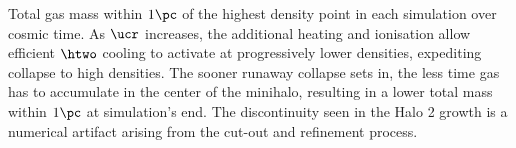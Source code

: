 \label{fig:collapse}
Total gas mass within $1\pc$ of the highest density point in each simulation over cosmic time.
As $\ucr$ increases, the additional heating and ionisation allow efficient $\htwo$ cooling to activate at progressively lower densities, expediting collapse to high densities.  
The sooner runaway collapse sets in, the less time gas has to accumulate in the center of the minihalo, resulting in a lower total mass within $1\pc$ at simulation's end.
The discontinuity seen in the Halo 2 growth is a numerical artifact arising from the cut-out and refinement process.